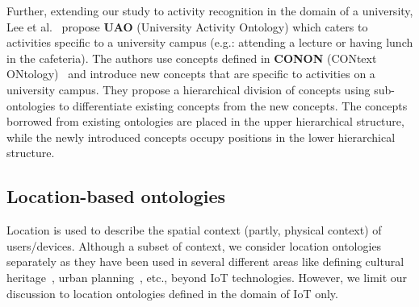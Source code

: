 \documentclass{elsart}  %
\begin{document}
Further, extending our study to activity recognition in the domain of a university, Lee et al.~\cite{lee2017location} propose \textbf{UAO} (University Activity Ontology) which caters to activities specific to a university campus (e.g.: attending a lecture or having lunch in the cafeteria). The authors use concepts defined in \textbf{CONON} (CONtext ONtology)~\cite{wang2004ontology} and introduce new concepts that are specific to activities on a university campus. They propose a hierarchical division of concepts using sub-ontologies to differentiate existing concepts from the new concepts. The concepts borrowed from existing ontologies are placed in the upper hierarchical structure, while the newly introduced concepts occupy positions in the lower hierarchical structure.

\subsection{Location-based ontologies} Location is used to describe the spatial context (partly, physical context) of users/devices. Although a subset of context, we consider location ontologies separately as they have been used in several different areas like defining cultural heritage~\cite{cacciotti2013monument}, urban planning~\cite{liao2015place}, etc., beyond IoT technologies. However, we limit our discussion to location ontologies defined in the domain of IoT only.
\end{document}
